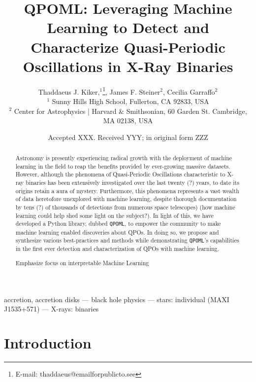 \documentclass[fleqn,usenatbib]{mnras}
\title[QPOML]{QPOML: Leveraging Machine Learning to Detect and Characterize Quasi-Periodic Oscillations in X-Ray Binaries}
\author[Kiker et al.]{Thaddaeus J. Kiker,$^{1}$\thanks{E-mail: thaddaeus@emailforpublicto.see}, James F. Steiner$^{2}$,
Cecilia Garraffo$^{2}$\\
$^{1}$ Sunny Hills High School, Fullerton, CA 92833, USA\\
$^{2}$ Center for Astrophysics | Harvard \& Smithsonian, 60 Garden St. Cambridge, MA 02138, USA\\
}
\date{Accepted XXX. Received YYY; in original form ZZZ}
\begin{document}
\label{firstpage}  
\pagerange{\pageref{firstpage}--\pageref{lastpage}}
\maketitle

\begin{abstract}
Astronomy is presently experiencing radical growth with the deployment of machine learning in the field to reap the benefits provided by ever-growing massive datasets. However, although the phenomena of Quasi-Periodic Oscillations characteristic to X-ray binaries has been extensively investigated over the last twenty (?) years, to date its origins retain a aura of mystery. Furthermore, this phenomena represents a vast wealth of data heretofore unexplored with machine learning, despite thorough documentation by tens (?) of thousands of detections from numerous space telescopes) (how machine learning could help shed some light on the subject?). In light of this, we have developed a Python library, dubbed \texttt{QPOML}, to empower the community to make machine learning enabled discoveries about QPOs. In doing so, we propose and synthesize various best-practices and methods while demonstrating \texttt{QPOML}'s capabilities in the first ever detection and characterization of QPOs with machine learning. 

Emphasize focus on interpretable Machine Learning

\end{abstract}

\begin{keywords}
accretion, accretion disks --- black hole physics --- stars: individual (MAXI\, J1535+571) --- X-rays: binaries
\end{keywords}

\clearpage

\section{Introduction}
\end{document}
